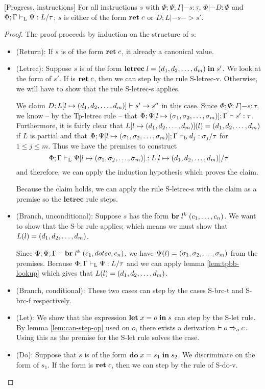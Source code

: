 \documentclass[a4paper, oneside, 10pt, draft]{memoir}
\begin{document}
\begin{lem}{[Progress, instructions]}
  \label{lem:progress-instructions}
  For all instructions $s$ with $\Phi;\Psi;\Gamma |- s : \tau$, $\Phi
  |- D : \Phi$ and $\Phi;\Gamma |-_{\mathrm{L}} \Psi : L / \tau$; $s$ is either
  of the form $\mathbf{ret} \; c$ or $D;L |- s -> s'$.
\end{lem}
\begin{proof}
  The proof proceeds by induction on the structure of $s$:
  \begin{itemize}
  \item (Return): If $s$ is of the form $\mathbf{ret} \; c$, it already a
    canonical value.
  \item (Letrec): Suppose $s$ is of the form
    $\mathbf{letrec} \; l = (d_1, d_2, \dotsc, d_m) \; \mathbf{in} \; s'$. We look at the form of $s'$. If is
    $\mathbf{ret} \; c$, then we can step by the rule S-letrec-v. Otherwise, we
    will have to show that the rule S-letrec-s applies.

    We claim $D;L[l \mapsto (d_1, d_2, \dotsc, d_m)] |- s' -> s''$ in this
    case. Since $\Phi;\Psi;\Gamma |- s : \tau$, we know -- by the
    Tp-letrec rule -- that $\Phi;\Psi[l \mapsto (\sigma_1, \sigma_2, \dotsc, \sigma_m)];\Gamma |- s'
    : \tau$. Furthermore, it is fairly clear that $L[l \mapsto
    (d_1, d_2, \dotsc, d_m)](l) = (d_1, d_2, \dotsc, d_m)$ if $L$ is partial and that $\Phi;\Psi[l
    \mapsto (\sigma_1, \sigma_2, \dotsc, \sigma_m)];\Gamma |-_{\mathrm{b}} d_j : \sigma_j / \tau$ for $1 \leq j
    \leq m$. Thus we have the premises to construct
    \begin{equation*}
      \Phi;\Gamma |-_{\mathrm{L}} \Psi[l \mapsto (\sigma_1, \sigma_2, \dotsc, \sigma_m)] : L[l \mapsto
      (d_1, d_2, \dotsc, d_m)] / \tau
    \end{equation*}
    and therefore, we can apply the induction hypothesis which proves the claim.

    Because the claim holds, we can apply the rule S-letrec-s with the
    claim as a premise so the $\mathbf{letrec}$ rule steps.
  \item (Branch, unconditional): Suppose $s$ has the form $\mathbf{br} \; l^k \; (c_1, \dotsc,
      c_n)$. We want to show that the S-br rule applies; which means
    we must show that $L(l) = (d_1, d_2, \dotsc, d_m)$.

    Since $\Phi;\Psi;\Gamma |- \mathbf{br} \; l^k \; (c_1, dotsc, c_n)$, we have
    $\Psi(l) = (\sigma_1, \sigma_2, \dotsc, \sigma_m)$ from the premises. Because $\Phi;\Gamma |-_{\mathrm{L}}
    \Psi : L / \tau$ and we can apply lemma
    \ref{lem:tpbb-lookup} which gives that $L(l) = (d_1, d_2, \dotsc, d_m)$.

  \item (Branch, conditional): These two cases can step by the cases
    S-brc-t and S-brc-f respectively.
  \item (Let): We show that the expression $\mathbf{let} \; x = o \; \mathbf{in} \; s$ can step
    by the S-let rule. By lemma \ref{lem:can-step-op} used on $o$,
    there exists a derivation $|- o =>_{o} c$. Using this as the premise
    for the S-let rule solves the case.
  \item (Do): Suppose that $s$ is of the form $\mathbf{do} \; x = s_1 \; \mathbf{in} \; s_2$. We
    discriminate on the form of $s_1$. If the form is $\mathbf{ret} \; c$, then
    we can step by the rule of S-do-v.


\end{itemize}
\end{proof}
\end{document}
